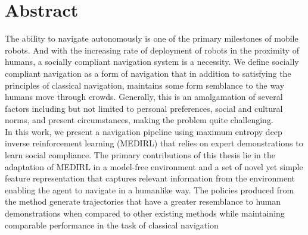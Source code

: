 \chapter*{\rm\bfseries Abstract}
The ability to navigate autonomously is one of the primary milestones of mobile robots. And with the increasing rate of deployment of robots in the proximity of humans, a socially compliant navigation system is a necessity. We define socially compliant navigation as a form of navigation that in addition to satisfying the principles of classical navigation, maintains some form semblance to the way humans move through crowds. Generally, this is an amalgamation of several factors including but not limited to personal preferences, social and cultural norms, and present circumstances, making the problem quite challenging.\\
In this work, we present a navigation pipeline using maximum entropy deep inverse reinforcement learning (MEDIRL) that relies on expert demonstrations to learn social compliance. The primary contributions of this thesis lie in the adaptation of MEDIRL in a model-free environment and a set of novel yet simple feature representation that captures relevant information from the environment enabling the agent to navigate in a humanlike way. The policies produced from the method generate trajectories that have a greater resemblance to human demonstrations when compared to other existing methods while maintaining comparable performance in the task of classical navigation 


